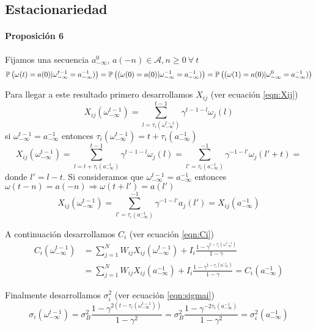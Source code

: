 \subsection{Estacionariedad}

\paragraph{Proposición 6} Fijamos una secuencia $a_{-\infty}^0$, $a(-n) \in \mathcal{A}, n\geq 0 \ \forall \ t$
\begin{equation}
    \mathbb{P}\left(\omega(t)=a(0) | \omega_{-\infty}^{t-1}=a_{-\infty}^{-1})\right) = 
    \mathbb{P}\left((\omega(0)=a(0) | \omega_{-\infty}^{-1}=a_{-\infty}^{-1})\right) = 
    \mathbb{P}\left((\omega(1)=a(0) | \omega_{-\infty}^{0}=a_{-\infty}^{-1})\right)
\end{equation}

Para llegar a este resultado primero desarrollamos $X_{ij}$ (ver ecuación \eqref{eqn:Xij})
\begin{equation*}
    X_{ij}(\omega_{-\infty}^{t-1}) = \sum_{l=\tau_i(\omega_{-\infty}^{t-1})}^{t-1} \gamma^{t-1-l} \omega_j(l)
\end{equation*}
si $\omega_{-\infty}^{t-1} = a_{-\infty}^{-1}$ entonces $\tau_i(\omega_{-\infty}^{t-1}) = t + \tau_i(a_{-\infty}^{-1})$
\begin{equation*}
    X_{ij}(\omega_{-\infty}^{t-1}) = 
    \sum_{l=t + \tau_i(a_{-\infty}^{-1})}^{t-1} \gamma^{t-1-l} \omega_j(l) = 
    \sum_{l'= \tau_i(a_{-\infty}^{-1})}^{-1} \gamma^{-1-l'} \omega_j(l'+t) =
\end{equation*}
donde $l'=l-t$. Si consideramos que $\omega_{-\infty}^{t-1} = a_{-\infty}^{-1}$ entonces $\omega(t-n)=a(-n) \Rightarrow \omega(t+l') = a(l')$
\begin{equation}
    X_{ij}(\omega_{-\infty}^{t-1}) = 
    \sum_{l'= \tau_i(a_{-\infty}^{-1})}^{-1} \gamma^{-1-l'} a_j(l') = X_{ij}(a_{-\infty}^{-1})
\end{equation}

A continuación desarrollamos $C_i$ (ver ecuación \eqref{eqn:Ci})
\begin{align}
\nonumber    C_i(\omega_{-\infty}^{t-1}) &= \sum_{j=1}^N W_{ij} X_{ij}(\omega_{-\infty}^{t-1}) + I_i \frac{1-\gamma^{t-\tau_i(\omega_{-\infty}^{t-1})}}{1-\gamma} \\
    &= \sum_{j=1}^N W_{ij} X_{ij}(a_{-\infty}^{-1}) + I_i \frac{1-\gamma^{t-\tau_i(a_{-\infty}^{-1})}}{1-\gamma} = C_i(a_{-\infty}^{-1})
\end{align}

Finalmente desarrollamos $\sigma_i^2$ (ver ecuación \eqref{eqn:sigmai})
\begin{equation}
  \sigma_i(\omega_{-\infty}^{t-1})= \sigma_B^2 \frac{1-\gamma^{2(t-\tau_i(\omega_{-\infty}^{t-1}))}}{1-\gamma^2} = \sigma_B^2 \frac{1-\gamma^{-2 \tau_i(a_{-\infty}^{-1})}}{1-\gamma^2} = \sigma_i^2(a_{-\infty}^{-1})
\end{equation}

